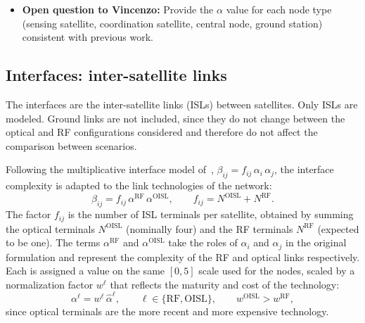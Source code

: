 \documentclass[11pt]{article}
\newcommand{\vincenzoq}[1]{\textcolor{vincenzoq}{\textbf{Open question to Vincenzo:}} #1}
\begin{document}
\begin{itemize}[leftmargin=1.2cm]
    \item \vincenzoq{Provide the $\alpha$ value for each node type (sensing satellite, coordination satellite, central node, ground station) consistent with previous work.}
\end{itemize}

\subsection{Interfaces: inter-satellite links}\label{subsec:complexity-links}

The interfaces are the inter-satellite links (ISLs) between satellites. Only ISLs are modeled. Ground links are not included, since they do not change between the optical and RF configurations considered and therefore do not affect the comparison between scenarios.

Following the multiplicative interface model of~\cite{sinha2013}, $\beta_{ij} = f_{ij}\,\alpha_i\,\alpha_j$, the interface complexity is adapted to the link technologies of the network:
\begin{equation}
    \beta_{ij} = f_{ij}\,\alpha^{\mathrm{RF}}\,\alpha^{\mathrm{OISL}}, \qquad f_{ij} = N^{\mathrm{OISL}} + N^{\mathrm{RF}}.
\end{equation}
The factor $f_{ij}$ is the number of ISL terminals per satellite, obtained by summing the optical terminals $N^{\mathrm{OISL}}$ (nominally four) and the RF terminals $N^{\mathrm{RF}}$ (expected to be one). The terms $\alpha^{\mathrm{RF}}$ and $\alpha^{\mathrm{OISL}}$ take the roles of $\alpha_i$ and $\alpha_j$ in the original formulation and represent the complexity of the RF and optical links respectively. Each is assigned a value on the same $[0,5]$ scale used for the nodes, scaled by a normalization factor $w^{\ell}$ that reflects the maturity and cost of the technology:
\begin{equation}
    \alpha^{\ell} = w^{\ell}\,\hat{\alpha}^{\ell}, \qquad \ell \in \{\mathrm{RF}, \mathrm{OISL}\}, \qquad w^{\mathrm{OISL}} > w^{\mathrm{RF}},
\end{equation}
since optical terminals are the more recent and more expensive technology.
\end{document}
